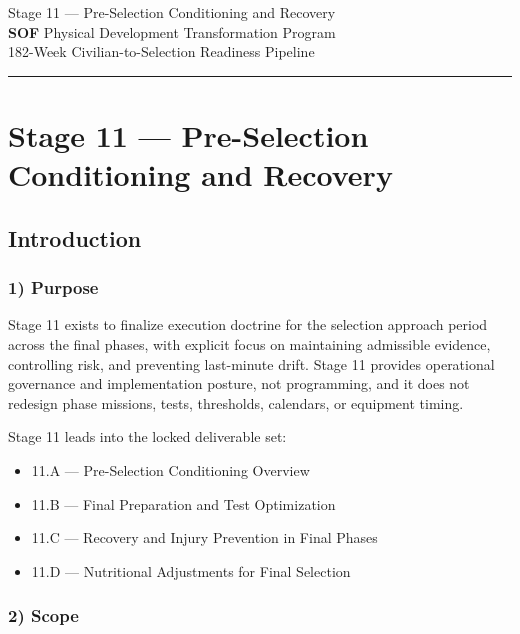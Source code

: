 \documentclass[10pt]{article}
\newcommand{\TitleLine}{\textcolor{StageBlue}{\rule{0.98\linewidth}{0.95pt}}}
\begin{document}
\begin{tcolorbox}
\begin{center}
Stage 11 — Pre-Selection Conditioning and Recovery\\
\textbf{SOF} Physical Development Transformation Program\\
182-Week Civilian-to-Selection Readiness Pipeline
\TitleLine
\end{center}
\end{tcolorbox}

\vspace{0.35em}

\section*{Stage 11 — Pre-Selection Conditioning and Recovery}
{}

\subsection*{Introduction}
{}

\subsubsection*{1) Purpose}

Stage 11 exists to finalize execution doctrine for the selection approach period across the final phases, with explicit focus on maintaining admissible evidence, controlling risk, and preventing last-minute drift. Stage 11 provides operational governance and implementation posture, not programming, and it does not redesign phase missions, tests, thresholds, calendars, or equipment timing.

Stage 11 leads into the locked deliverable set:

\begin{itemize}
\item 11.A — Pre-Selection Conditioning Overview
\item 11.B — Final Preparation and Test Optimization
\item 11.C — Recovery and Injury Prevention in Final Phases
\item 11.D — Nutritional Adjustments for Final Selection
\end{itemize}

\subsubsection*{2) Scope}
\end{document}
